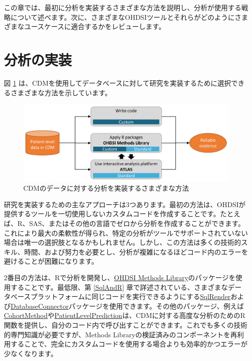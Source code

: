 \documentclass[
  11pt]{book}
\theoremstyle{definition}
\theoremstyle{definition}
\theoremstyle{definition}
\theoremstyle{definition}
\theoremstyle{remark}
\begin{document}
この章では、最初に分析を実装するさまざまな方法を説明し、分析が使用する戦略について述べます。次に、さまざまなOHDSIツールとそれらがどのようにさまざまなユースケースに適合するかをレビューします。

\section{分析の実装}\label{analysisImplementation}

図 \ref{fig:implementations} は、CDMを使用してデータベースに対して研究を実装するために選択できるさまざまな方法を示しています。 

\begin{figure}

{\centering \includegraphics[width=0.9\linewidth]{images/OhdsiAnalyticsTools/implementations} 

}

\caption{CDMのデータに対する分析を実装するさまざまな方法}\label{fig:implementations}
\end{figure}

研究を実装するための主なアプローチは3つあります。最初の方法は、OHDSIが提供するツールを一切使用しないカスタムコードを作成することです。たとえば、R、SAS、またはその他の言語でゼロから分析を作成することができます。これにより最大の柔軟性が得られ、特定の分析がツールでサポートされていない場合は唯一の選択肢となるかもしれません。しかし、この方法は多くの技術的スキル、時間、および努力を必要とし、分析が複雑になるほどコード内のエラーを避けることが困難になります。

2番目の方法は、Rで分析を開発し、\href{https://ohdsi.github.io/MethodsLibrary/}{OHDSI Methods Library}のパッケージを使用することです。最低限、第 \ref{SqlAndR} 章で詳述されている、さまざまなデータベースプラットフォームに同じコードを実行できるようにする\href{https://ohdsi.github.io/SqlRender/}{SqlRender}および\href{https://ohdsi.github.io/DatabaseConnector/}{DatabaseConnector}パッケージを使用できます。その他のパッケージ、例えば\href{https://ohdsi.github.io/CohortMethod/}{CohortMethod}や\href{https://ohdsi.github.io/PatientLevelPrediction/}{PatientLevelPrediction}は、CDMに対する高度な分析のためのR関数を提供し、自分のコード内で呼び出すことができます。これでも多くの技術的専門知識が必要ですが、Methods Libraryの検証済みのコンポーネントを再利用することで、完全にカスタムコードを使用する場合よりも効率的かつエラーが少なくなります。
\end{document}
